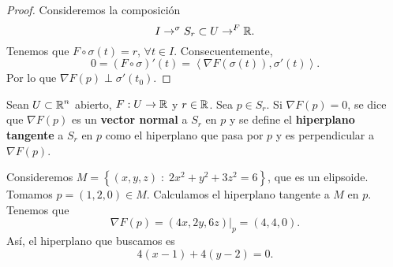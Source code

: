 \begin{proof}
Consideremos la composición
\[I \to ^{\sigma } S_{r} \subset U \to ^{F} \mathbb{R} .\]
Tenemos que $\displaystyle F\circ \sigma\left(t\right) = r $, $\displaystyle \forall t \in I $. Consecuentemente, 
\[0 = \left(F\circ \sigma \right)'\left(t\right) = \left\langle \nabla F\left(\sigma \left(t\right)\right), \sigma'\left(t\right) \right\rangle  .\]
Por lo que $\displaystyle \nabla F\left(p\right) \perp\sigma'\left(t_{0}\right) $.
\end{proof}
\begin{definition}
Sean $\displaystyle U\subset\mathbb{R}^{n} $ abierto, $\displaystyle F:U \to \mathbb{R} $ y $\displaystyle r \in \mathbb{R} $. Sea $\displaystyle p \in S_{r} $. Si $\displaystyle \nabla F\left(p\right)= 0 $, se dice que $\displaystyle \nabla F\left(p\right) $ es un \textbf{vector normal} a $\displaystyle S_{r} $ en $\displaystyle p $ y se define el \textbf{hiperplano tangente} a $\displaystyle S_{r} $ en $\displaystyle p $ como el hiperplano que pasa por $\displaystyle p $ y es perpendicular a $\displaystyle \nabla F\left(p\right) $.
\end{definition}
\begin{eg}
	Consideremos $\displaystyle M = \left\{ \left(x,y,z\right) \; : \; 2x^{2} +y^{2}+3z^{2} = 6\right\}  $, que es un elipsoide. Tomamos $\displaystyle p= \left(1,2,0\right) \in M $. Calculamos el hiperplano tangente a $\displaystyle M $ en $\displaystyle p $. Tenemos que 
	\[\nabla F\left(p\right)= \left(4x,2y,6z\right)|_{p}= \left(4,4,0\right) .\]
Así, el hiperplano que buscamos es
\[4\left(x-1\right) + 4\left(y-2\right) = 0 .\]
\end{eg}
